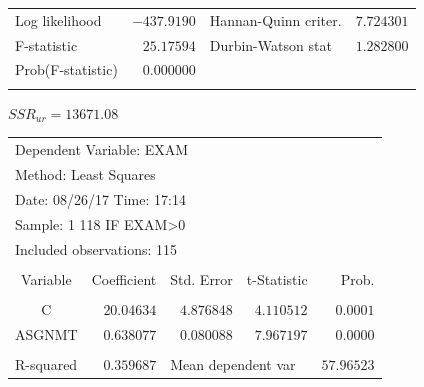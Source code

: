 \documentclass[12pt]{report}
\begin{document}
\begin{table}[H]
\begin{tabular}{lrrrr}
		\multicolumn{1}{l}{Log likelihood}&\multicolumn{1}{r}{$-437.9190$}&\multicolumn{2}{l}{Hannan-Quinn criter.}&\multicolumn{1}{r}{$7.724301$}\\
		\multicolumn{1}{l}{F-statistic}&\multicolumn{1}{r}{$25.17594$}&\multicolumn{2}{l}{Durbin-Watson stat}&\multicolumn{1}{r}{$1.282800$}\\
		\multicolumn{1}{l}{Prob(F-statistic)}&\multicolumn{1}{r}{$0.000000$}&\multicolumn{1}{c}{}&\multicolumn{1}{c}{}&\multicolumn{1}{c}{}\\
		[4.5pt] \hline \\ [-4.5pt]
	\end{tabular}
\end{table} \centering $SSR_{ur} = 13671.08$

\justify
\begin{table}[H]
	\centering
	\begin{tabular}{lrrrr}
		\multicolumn{3}{l}{Dependent Variable: EXAM}&\multicolumn{1}{c}{}&\multicolumn{1}{c}{}\\
		\multicolumn{3}{l}{Method: Least Squares}&\multicolumn{1}{c}{}&\multicolumn{1}{c}{}\\
		\multicolumn{3}{l}{Date: 08/26/17   Time: 17:14}&\multicolumn{1}{c}{}&\multicolumn{1}{c}{}\\
		\multicolumn{3}{l}{Sample: 1 118 IF EXAM\textgreater 0}&\multicolumn{1}{c}{}&\multicolumn{1}{c}{}\\
		\multicolumn{3}{l}{Included observations: 115}&\multicolumn{1}{c}{}&\multicolumn{1}{c}{}\\
		[4.5pt] \hline \\ [-4.5pt]
		\multicolumn{1}{c}{Variable}&\multicolumn{1}{r}{Coefficient}&\multicolumn{1}{r}{Std. Error}&\multicolumn{1}{r}{t-Statistic}&\multicolumn{1}{r}{Prob.}\\
		[4.5pt] \hline \\ [-4.5pt]
		\multicolumn{1}{c}{C}&\multicolumn{1}{r}{$20.04634$}&\multicolumn{1}{r}{$4.876848$}&\multicolumn{1}{r}{$4.110512$}&\multicolumn{1}{r}{$0.0001$}\\
		\multicolumn{1}{c}{ASGNMT}&\multicolumn{1}{r}{$0.638077$}&\multicolumn{1}{r}{$0.080088$}&\multicolumn{1}{r}{$7.967197$}&\multicolumn{1}{r}{$0.0000$}\\
		[4.5pt] \hline \\ [-4.5pt]
		\multicolumn{1}{l}{R-squared}&\multicolumn{1}{r}{$0.359687$}&\multicolumn{2}{l}{Mean dependent var}&\multicolumn{1}{r}{$57.96523$}\\

\end{tabular}
\end{table}
\end{document}
